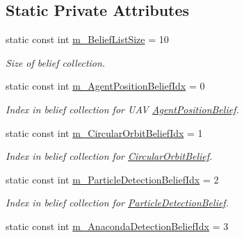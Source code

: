 \subsection*{Static Private Attributes}
\begin{DoxyCompactItemize}
\item 
\hypertarget{class_belief_collection_af08914f4c31838824538e5203f0fa8a3}{
static const int \hyperlink{class_belief_collection_af08914f4c31838824538e5203f0fa8a3}{m\_\-BeliefListSize} = 10}
\label{class_belief_collection_af08914f4c31838824538e5203f0fa8a3}

\begin{DoxyCompactList}\small\item\em Size of belief collection. \end{DoxyCompactList}\item 
\hypertarget{class_belief_collection_a3cf2366409520271dfd8725c2ee38a91}{
static const int \hyperlink{class_belief_collection_a3cf2366409520271dfd8725c2ee38a91}{m\_\-AgentPositionBeliefIdx} = 0}
\label{class_belief_collection_a3cf2366409520271dfd8725c2ee38a91}

\begin{DoxyCompactList}\small\item\em Index in belief collection for UAV \hyperlink{class_agent_position_belief}{AgentPositionBelief}. \end{DoxyCompactList}\item 
\hypertarget{class_belief_collection_a3266e8a530f82abfa4784c9177c12a4f}{
static const int \hyperlink{class_belief_collection_a3266e8a530f82abfa4784c9177c12a4f}{m\_\-CircularOrbitBeliefIdx} = 1}
\label{class_belief_collection_a3266e8a530f82abfa4784c9177c12a4f}

\begin{DoxyCompactList}\small\item\em Index in belief collection for \hyperlink{class_circular_orbit_belief}{CircularOrbitBelief}. \end{DoxyCompactList}\item 
\hypertarget{class_belief_collection_a62e8e9949a14b86d4a93f53b72c7f315}{
static const int \hyperlink{class_belief_collection_a62e8e9949a14b86d4a93f53b72c7f315}{m\_\-ParticleDetectionBeliefIdx} = 2}
\label{class_belief_collection_a62e8e9949a14b86d4a93f53b72c7f315}

\begin{DoxyCompactList}\small\item\em Index in belief collection for \hyperlink{class_particle_detection_belief}{ParticleDetectionBelief}. \end{DoxyCompactList}\item 
\hypertarget{class_belief_collection_a9e295722357db92ebb76e2a911282b20}{
static const int \hyperlink{class_belief_collection_a9e295722357db92ebb76e2a911282b20}{m\_\-AnacondaDetectionBeliefIdx} = 3}
\label{class_belief_collection_a9e295722357db92ebb76e2a911282b20}


\end{DoxyCompactItemize}
